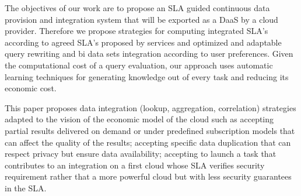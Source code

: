 The objectives of our work are to propose an SLA guided continuous data provision and integration system that will be exported as a DaaS by a cloud provider. 
Therefore we propose strategies for computing integrated SLA’s according to agreed SLA’s proposed by services and optimized and adaptable query rewriting and bi data sets integration according to user preferences. 
Given the computational cost of a query evaluation, our approach uses automatic learning techniques for generating knowledge out of every task and reducing its economic cost.

This paper proposes data integration (lookup, aggregation, correlation) strategies adapted to the vision of the economic model of the cloud such as accepting partial results delivered on demand or under predefined subscription models that can affect the quality of the results; accepting specific data duplication that can respect privacy but ensure data availability; accepting to launch a task that contributes to an integration on a first cloud whose SLA verifies security requirement rather that a more powerful cloud but with less security guarantees in the SLA. 